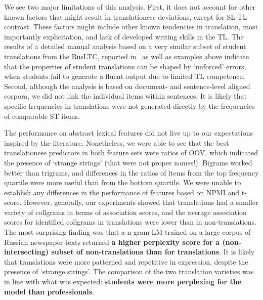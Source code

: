 We see two major limitations of this analysis. First, it does not account for other known factors that might result in translationese deviations, except for SL-TL contrast. These factors might include other known tendencies in translation, most importantly explicitation, and lack of developed writing skills in the TL. The results of a detailed manual analysis based on a very similar subset of student translations from the RusLTC, reported in~\citet{Kunilovskaya2023err} as well as examples above indicate that the properties of student translations can be shaped by `unforced' errors, when students fail to generate a fluent output due to limited TL competence.  
Second, although the analysis is based on document- and sentence-level aligned corpora, we did not link the individual items within sentences. It is likely that specific frequencies in translations were not generated directly by the frequencies of comparable ST items.

The performance on abstract lexical features did not live up to our expectations inspired by the literature. Nonetheless, we were able to see that the best translationese predictors in both feature sets were ratios of OOV, which indicated the presence of `strange strings' (that were not proper names!). Bigrams worked better than trigrams, and differences in the ratios of items from the top frequency quartile were more useful than from the bottom quartile. We were unable to establish any differences in the performance of features based on NPMI and t-score. However, generally, our experiments showed that translations had a smaller variety of collgrams in terms of association scores, and the average association scores for identified collgrams in translations were lower than in non-translations.
The most surprising finding was that a n-gram LM trained on a large corpus of Russian newspaper texts returned \textbf{a higher perplexity score for a (non-intersecting) subset of non-translations than for translations}. It is likely that translations were more patterned and repetitive in expression, despite the presence of `strange strings'. The comparison of the two translation varieties was in line with what was expected: \textbf{students were more perplexing for the model than professionals}. 
